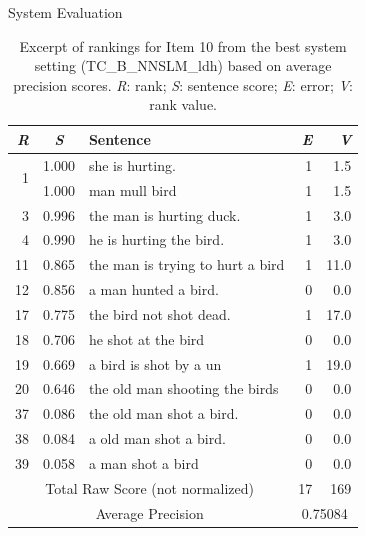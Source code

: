 \documentclass[final,t]{beamer}
\begin{document}
\begin{frame}{}
\begin{columns}[t]
\begin{column}{.64\linewidth}
\begin{columns}
\begin{column}{.49\linewidth}
\begin{block}{System Evaluation}
\begin{table}[htb!]
\begin{center}
\setlength{\tabcolsep}{0.3em}
\begin{tabular}{|r|c|l|r|r|}
 \hline
 \textit{R} & \textit{S} & Sentence & \textit{E} & \textit{V}\\
 \hline
 \hline
\multirow{2}{*}{1} & 1.000 & she is hurting. & 1 & 1.5 \\
& 1.000 & man mull bird & 1 & 1.5 \\
\hline
3 & 0.996 & the man is hurting duck. & 1 & 3.0 \\
4 & 0.990 & he is hurting the bird. & 1 & 3.0 \\
\hline
11 & 0.865 & the man is trying to hurt a bird & 1 & 11.0 \\
12 & 0.856 & a man hunted a bird. & 0 & 0.0 \\
\hline
17 & 0.775 & the bird not shot dead.  & 1 & 17.0 \\
18 & 0.706 & he shot at the bird & 0 & 0.0 \\
19 & 0.669 & a bird is shot by a un & 1 & 19.0 \\
20 & 0.646 & the old man shooting the birds & 0 & 0.0 \\
\hline
37 & 0.086 & the old man shot a bird. & 0 & 0.0 \\
38 & 0.084 & a old man shot a bird. & 0 & 0.0 \\
39 & 0.058 & a man shot a bird & 0 & 0.0 \\
  \hline
  \hline
  \multicolumn{3}{|c|}{Total Raw Score (not normalized)} & 17 & 169 \\
  \hline
  \multicolumn{3}{|c|}{Average Precision} & \multicolumn{2}{c|}{0.75084} \\
 \hline
\end{tabular}
\begin{minipage}{.9\textwidth}
\vspace{.7em}
\caption{Excerpt of rankings for Item 10 from the best system setting (TC\_B\_NNSLM\_ldh) based on average precision scores. \textit{R}: rank; \textit{S}: sentence score; \textit{E}: error; \textit{V}: rank value. }
\label{tab:i10responses-avgprec}
\end{minipage}
\end{center}
\end{table}
\end{block}


\end{column}
\end{columns}
\end{column}
\end{columns}
\end{frame}
\end{document}
